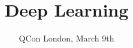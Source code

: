 


\title{Deep Learning}
\author{}
\date{QCon London, March 9th}


\begin{frame}
	\titlepage
\end{frame}






